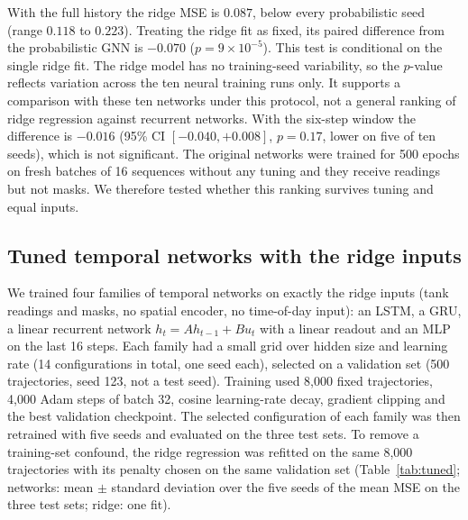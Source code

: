 \documentclass[conference]{IEEEtran}
\begin{document}
\begin{table}[t]
\centering
\caption{Ridge regression MSE by window length.}
\label{tab:window}
\small
{}
\end{table}

With the full history the ridge MSE is $0.087$, below every probabilistic seed (range $0.118$ to $0.223$). Treating the ridge fit as fixed, its paired difference from the probabilistic GNN is $-0.070$ ($p=9\times10^{-5}$). This test is conditional on the single ridge fit. The ridge model has no training-seed variability, so the $p$-value reflects variation across the ten neural training runs only. It supports a comparison with these ten networks under this protocol, not a general ranking of ridge regression against recurrent networks. With the six-step window the difference is $-0.016$ (95\% CI $[-0.040,+0.008]$, $p=0.17$, lower on five of ten seeds), which is not significant. The original networks were trained for 500 epochs on fresh batches of 16 sequences without any tuning and they receive readings but not masks. We therefore tested whether this ranking survives tuning and equal inputs.

\subsection{Tuned temporal networks with the ridge inputs}
\label{sec:tuned}

We trained four families of temporal networks on exactly the ridge inputs (tank readings and masks, no spatial encoder, no time-of-day input): an LSTM, a GRU, a linear recurrent network $h_t=Ah_{t-1}+Bu_t$ with a linear readout and an MLP on the last 16 steps. Each family had a small grid over hidden size and learning rate (14 configurations in total, one seed each), selected on a validation set (500 trajectories, seed 123, not a test seed). Training used 8,000 fixed trajectories, 4,000 Adam steps of batch 32, cosine learning-rate decay, gradient clipping and the best validation checkpoint. The selected configuration of each family was then retrained with five seeds and evaluated on the three test sets. To remove a training-set confound, the ridge regression was refitted on the same 8,000 trajectories with its penalty chosen on the same validation set (Table~\ref{tab:tuned}; networks: mean $\pm$ standard deviation over the five seeds of the mean MSE on the three test sets; ridge: one fit).
\end{document}
